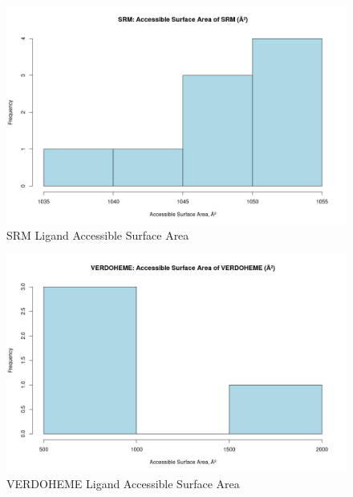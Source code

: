 	\begin{figure}
		\caption{SRM Ligand Accessible Surface Area}
		\label{figs:SRM_ligandAccSA}
		\includegraphics[width=\linewidth]{7A/SRM_ligandAccSA}
	\end{figure}

	\begin{figure}
		\caption{VERDOHEME Ligand Accessible Surface Area}
		\label{figs:VERDOHEME_ligandAccSA}
		\includegraphics[width=\linewidth]{7A/VERDOHEME_ligandAccSA}
	\end{figure}

